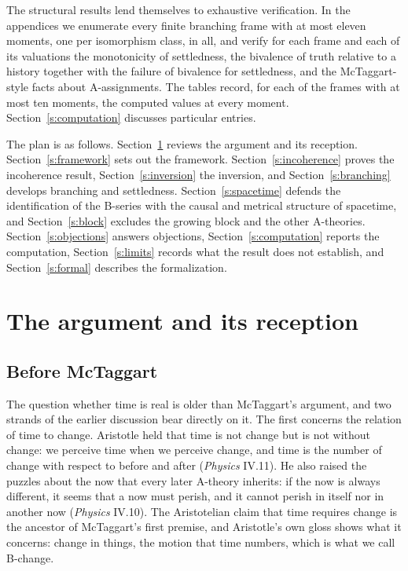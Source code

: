 \documentclass{situationist-preprint}
\begin{document}
The structural results lend themselves to exhaustive verification. In the appendices we enumerate every finite branching frame with at most eleven moments, one per isomorphism class, \NFrames{} in all, and verify for each frame and each of its valuations the monotonicity of settledness, the bivalence of truth relative to a history together with the failure of bivalence for settledness, and the McTaggart-style facts about A-assignments. The tables record, for each of the \NFramesDetail{} frames with at most ten moments, the computed values at every moment. Section~\ref{s:computation} discusses particular entries.

The plan is as follows. Section~\ref{s:history} reviews the argument and its reception. Section~\ref{s:framework} sets out the framework. Section~\ref{s:incoherence} proves the incoherence result, Section~\ref{s:inversion} the inversion, and Section~\ref{s:branching} develops branching and settledness. Section~\ref{s:spacetime} defends the identification of the B-series with the causal and metrical structure of spacetime, and Section~\ref{s:block} excludes the growing block and the other A-theories. Section~\ref{s:objections} answers objections, Section~\ref{s:computation} reports the computation, Section~\ref{s:limits} records what the result does not establish, and Section~\ref{s:formal} describes the formalization.

\section{The argument and its reception}\label{s:history}

\subsection{Before McTaggart}

The question whether time is real is older than McTaggart's argument, and two strands of the earlier discussion bear directly on it. The first concerns the relation of time to change. Aristotle held that time is not change but is not without change: we perceive time when we perceive change, and time is the number of change with respect to before and after (\emph{Physics} IV.11). He also raised the puzzles about the now that every later A-theory inherits: if the now is always different, it seems that a now must perish, and it cannot perish in itself nor in another now (\emph{Physics} IV.10). The Aristotelian claim that time requires change is the ancestor of McTaggart's first premise, and Aristotle's own gloss shows what it concerns: change in things, the motion that time numbers, which is what we call B-change.
\end{document}

